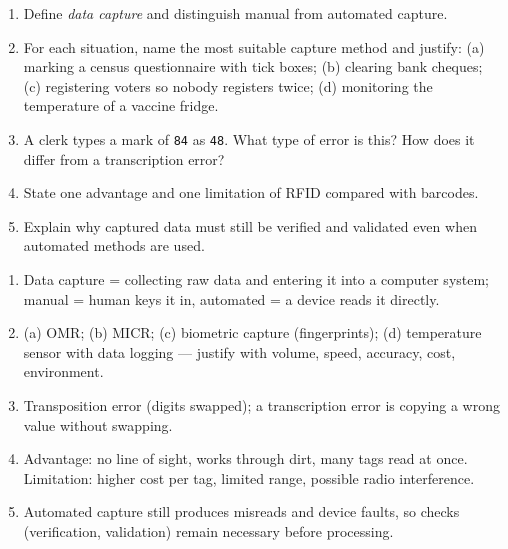 \documentclass[11pt]{article}
\begin{document}
\begin{exercice}
\begin{enumerate}
\item Define \emph{data capture} and distinguish manual from automated capture.
\item For each situation, name the most suitable capture method and justify: (a) marking a census questionnaire with tick boxes; (b) clearing bank cheques; (c) registering voters so nobody registers twice; (d) monitoring the temperature of a vaccine fridge.
\item A clerk types a mark of \texttt{84} as \texttt{48}. What type of error is this? How does it differ from a transcription error?
\item State one advantage and one limitation of RFID compared with barcodes.
\item Explain why captured data must still be verified and validated even when automated methods are used.
\end{enumerate}
\end{exercice}

\begin{corrige}
\begin{enumerate}
\item Data capture = collecting raw data and entering it into a computer system; manual = human keys it in, automated = a device reads it directly.
\item (a) OMR; (b) MICR; (c) biometric capture (fingerprints); (d) temperature sensor with data logging --- justify with volume, speed, accuracy, cost, environment.
\item Transposition error (digits swapped); a transcription error is copying a wrong value without swapping.
\item Advantage: no line of sight, works through dirt, many tags read at once. Limitation: higher cost per tag, limited range, possible radio interference.
\item Automated capture still produces misreads and device faults, so checks (verification, validation) remain necessary before processing.
\end{enumerate}
\end{corrige}
\end{document}
